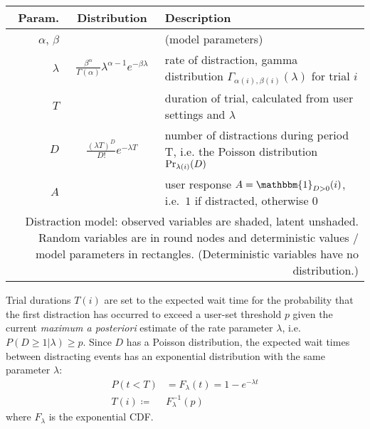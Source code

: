 \documentclass{article}
\begin{document}
{\centering
\begin{minipage}{\linewidth-40pt}
	\centering
\end{minipage}
\bigskip\\


\begin{tabularx}{\linewidth-30pt}{r c X}
	\toprule
		Param. & Distribution &Description\\
	\midrule
		$\alpha$, $\beta$ &  & (model parameters)\\
		$\lambda$& $\frac{\beta^\alpha}{\Gamma(\alpha)}\lambda^{\alpha-1}e^{-\beta\lambda}$&rate of distraction, gamma distribution $\Gamma_{\alpha(i),\beta(i)}(\lambda)$ for trial $i$\\
		$T$ &  & duration of trial, calculated from user settings and $\lambda$ \\
		$D$& $\frac{(\lambda T)^D}{D!} e^{-\lambda T}$ & number of distractions during period T, i.e. the Poisson distribution ${\rm Pr}_{\lambda(i)}(D)$\\
		$A$ &  & user response $A=\mathbbm{1}_{D>0}(i)$, i.e.\ $1$ if distracted, otherwise $0$\\
	\bottomrule

	\multicolumn{3}{p{\linewidth-40pt}}{	\rule{0pt}{5ex}  Distraction model:  observed variables are shaded, latent unshaded.  Random variables are in round nodes and deterministic values / model parameters in rectangles.  (Deterministic variables have no distribution.)}	\\
\end{tabularx}






}
\bigskip
Trial durations $T(i)$ are set to the expected wait time for the probability that the first distraction has occurred to exceed a user-set threshold $p$ given the current \emph{maximum a posteriori}  estimate of the rate parameter $\lambda$,  i.e. $P(D\geq 1|\lambda) \geq p$.  Since $D$ has a Poisson distribution, the expected wait times between distracting events has an exponential distribution with the same parameter $\lambda$:
\begin{align}
  P(t<T)&=F_{\lambda}(t)=1-e^{-\lambda  t}\nonumber\\
  T(i)\coloneqq& F_{\lambda}^{-1}(p)
\end{align}
where $F_{\lambda}$ is the exponential CDF.  
\end{document}
